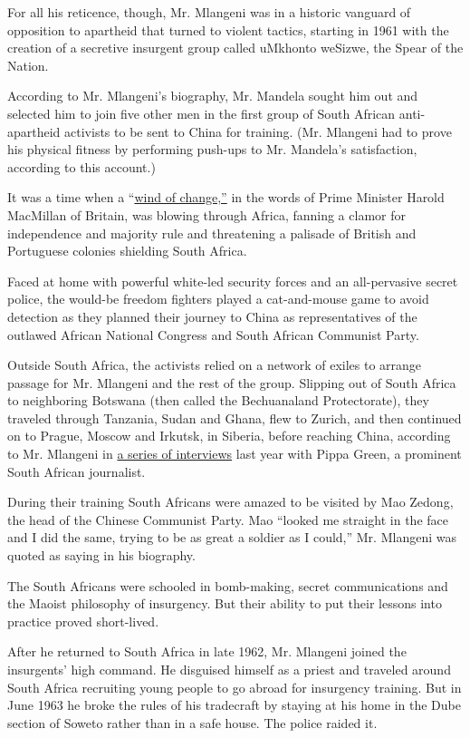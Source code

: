 For all his reticence, though, Mr. Mlangeni was in a historic vanguard
of opposition to apartheid that turned to violent tactics, starting in
1961 with the creation of a secretive insurgent group called uMkhonto
weSizwe, the Spear of the Nation.

According to Mr. Mlangeni's biography, Mr. Mandela sought him out and
selected him to join five other men in the first group of South African
anti-apartheid activists to be sent to China for training. (Mr. Mlangeni
had to prove his physical fitness by performing push-ups to Mr.
Mandela's satisfaction, according to this account.)

It was a time when a
``\href{https://web-archives.univ-pau.fr/english/TD2doc1.pdf}{wind of
change,''} in the words of Prime Minister Harold MacMillan of Britain,
was blowing through Africa, fanning a clamor for independence and
majority rule and threatening a palisade of British and Portuguese
colonies shielding South Africa.

Faced at home with powerful white-led security forces and an
all-pervasive secret police, the would-be freedom fighters played a
cat-and-mouse game to avoid detection as they planned their journey to
China as representatives of the outlawed African National Congress and
South African Communist Party.

Outside South Africa, the activists relied on a network of exiles to
arrange passage for Mr. Mlangeni and the rest of the group. Slipping out
of South Africa to neighboring Botswana (then called the Bechuanaland
Protectorate), they traveled through Tanzania, Sudan and Ghana, flew to
Zurich, and then continued on to Prague, Moscow and Irkutsk, in Siberia,
before reaching China, according to Mr. Mlangeni in
\href{http://www.702.co.za/podcasts/33/history-for-the-future/286913/rivonia-trialist-andrew-mlangeni-more-than-just-a-prestigious-backroom-boy}{a
series of interviews} last year with Pippa Green, a prominent South
African journalist.

During their training South Africans were amazed to be visited by Mao
Zedong, the head of the Chinese Communist Party. Mao ``looked me
straight in the face and I did the same, trying to be as great a soldier
as I could,'' Mr. Mlangeni was quoted as saying in his biography.

The South Africans were schooled in bomb-making, secret communications
and the Maoist philosophy of insurgency. But their ability to put their
lessons into practice proved short-lived.

After he returned to South Africa in late 1962, Mr. Mlangeni joined the
insurgents' high command. He disguised himself as a priest and traveled
around South Africa recruiting young people to go abroad for insurgency
training. But in June 1963 he broke the rules of his tradecraft by
staying at his home in the Dube section of Soweto rather than in a safe
house. The police raided it.

